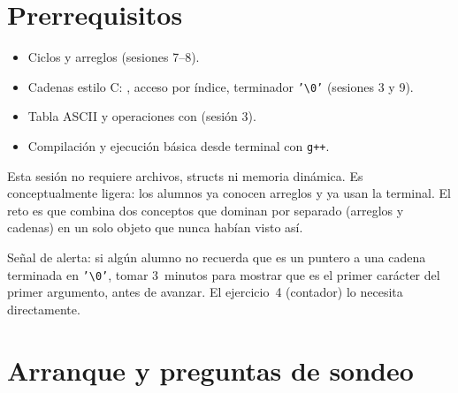 \documentclass[12pt, oneside]{article}
\begin{document}
\section{Prerrequisitos}

\begin{itemize}
  \item Ciclos  y arreglos (sesiones 7--8).
  \item Cadenas estilo C: , acceso por índice, terminador
        \texttt{'\textbackslash{}0'} (sesiones 3 y 9).
  \item Tabla ASCII y operaciones con  (sesión 3).
  \item Compilación y ejecución básica desde terminal con \texttt{g++}.
\end{itemize}

\begin{notaprofesor}
  Esta sesión no requiere archivos, structs ni memoria dinámica.  Es
  conceptualmente ligera: los alumnos ya conocen arreglos y ya usan la
  terminal.  El reto es que  combina dos conceptos que dominan
  por separado (arreglos y cadenas) en un solo objeto que nunca habían
  visto así.
  \par\smallskip
  Señal de alerta: si algún alumno no recuerda que  es un
  puntero a una cadena terminada en \texttt{'\textbackslash{}0'}, tomar
  3~minutos para mostrar que  es el primer carácter del
  primer argumento, antes de avanzar.  El ejercicio~4 (contador) lo
  necesita directamente.
\end{notaprofesor}

\section{Arranque y preguntas de sondeo}
\end{document}
